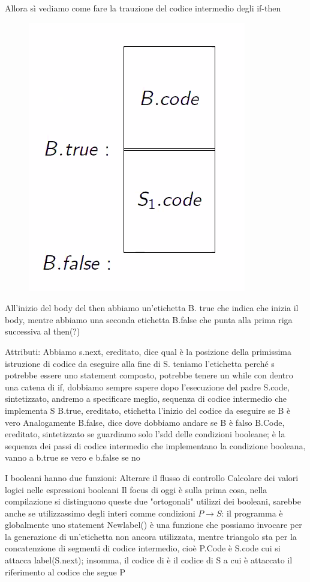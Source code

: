 \documentclass[class=book, crop=false, oneside, 12pt]{standalone}
\begin{document}
Allora sì vediamo come fare la trauzione del codice intermedio degli if-then
\begin{figure}[H]
    \centering
    \includegraphics[width=.5\textwidth]{if-then-abstract.png}
    \caption{}
    \label{}
\end{figure}
All'inizio del body del then abbiamo un'etichetta B. true che indica che inizia il body, mentre abbiamo una seconda etichetta B.false che punta alla prima riga successiva al then(?)

Attributi: 
Abbiamo s.next, ereditato, dice qual è la posizione della primissima istruzione di codice da eseguire alla fine di S. teniamo l'etichetta perché s potrebbe essere uno statement composto, potrebbe tenere un while con dentro una catena di if, dobbiamo sempre sapere dopo l'esecuzione del padre
S.code, sintetizzato, andremo a specificare meglio, sequenza di codice intermedio che implementa S
B.true, ereditato, etichetta l'inizio del codice da eseguire se B è vero
Analogamente B.false, dice dove dobbiamo andare se B è falso
B.Code, ereditato, sintetizzato se guardiamo solo l'sdd delle condizioni booleane; è la sequenza dei passi di codice intermedio che implementano la condizione booleana, vanno a b.true se vero e b.false se no

I booleani hanno due funzioni:
Alterare il flusso di controllo
Calcolare dei valori logici nelle espressioni booleani
Il focus di oggi è sulla prima cosa, nella compilazione si distinguono queste due "ortogonali" utilizzi dei booleani, sarebbe anche se utilizzassimo degli interi comme condizioni
\(P \to S\): il programma è globalmente uno statement
Newlabel() è una funzione che possiamo invocare per la generazione di un'etichetta non ancora utilizzata, mentre triangolo sta per la concatenzione di segmenti di codice intermedio, cioè P.Code è S.code cui si attacca label(S.next); insomma, il codice di è il codice di S a cui è attaccato il riferimento al codice che segue P
\end{document}
